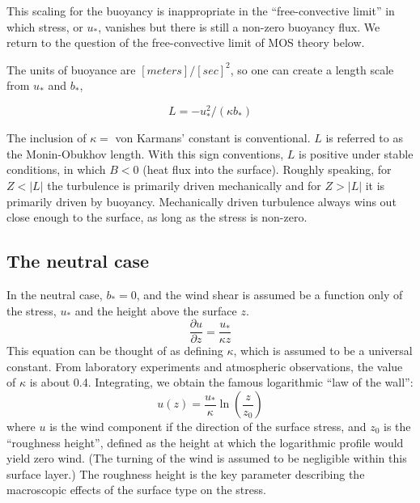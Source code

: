 \documentclass[12pt, letterpaper]{article}
\begin{document}
This scaling for the buoyancy is inappropriate in the
``free-convective limit'' in which stress, or $u_*$, vanishes but
there is still a non-zero buoyancy flux.  We return to the question of
the free-convective limit of MOS theory below.

The units of buoyance are $[meters]/[sec]^2$, so one can create a
length scale from $u_*$ and $b_*$,

\begin{equation}
  L = -u_*^2/(\kappa b_*)
\end{equation}

The inclusion of $\kappa =$ von Karmans' constant is conventional.  $L$ is
referred to as the Monin-Obukhov length.  With this sign conventions,
$L$ is positive under stable conditions, in which $B < 0$ (heat flux into
the surface).  Roughly speaking, for $Z < |L|$ the turbulence is
primarily driven mechanically and for $Z > |L|$ it is primarily driven
by buoyancy.  Mechanically driven turbulence always wins out close
enough to the surface, as long as the stress is non-zero.

\subsection{The neutral case}

In the neutral case, $b_* = 0$, and the wind shear is assumed be a
function only of the stress, $u_*$ and the height above the surface
$z$.
\begin{equation}
  \frac{\partial u}{\partial z} = \frac{u_*}{\kappa z}
\end{equation}
This equation can be thought of as defining $\kappa$, which is assumed
to be a universal constant.  From laboratory experiments and
atmospheric observations, the value of $\kappa$ is about 0.4.
Integrating, we obtain the famous logarithmic ``law of the wall'':
\begin{equation}
  u(z) = \frac{u_*}{\kappa} \ln \left( \frac{z}{z_0} \right)
\end{equation}
where $u$ is the wind component if the direction of the surface
stress, and $z_0$ is the ``roughness height'', defined as the height
at which the logarithmic profile would yield zero wind.  (The turning
of the wind is assumed to be negligible within this surface layer.)
The roughness height is the key parameter describing the macroscopic
effects of the surface type on the stress.
\end{document}
